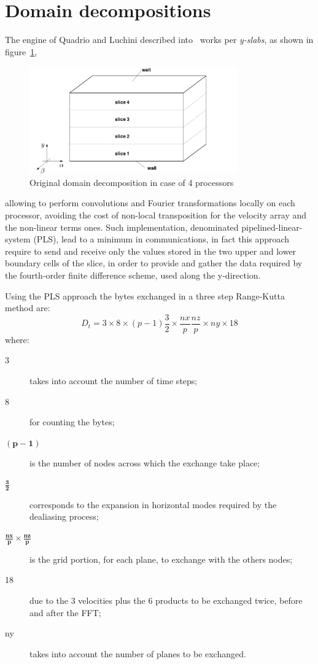 \section{Domain decompositions}
The engine of Quadrio and Luchini described into~\cite{cpl:presentazione} works per \emph{y-slabs}, as shown in figure~\ref{domain_decomp},
\begin{figure}
\centering
\includegraphics[width=0.8\textwidth]{grafici/decomp_dominio_cpl}
\caption{Original domain decomposition in case of 4 processors}
\label{domain_decomp}
\end{figure}
 allowing to perform convolutions and Fourier transformations locally on each processor, avoiding the cost of non-local transposition for the velocity array and the non-linear terms ones. Such implementation, denominated pipelined-linear-system (PLS), lead to a minimum in communications, in fact this approach require to send and receive only the values stored in the two upper and lower boundary cells of the slice, in order to provide and gather the data required by the fourth-order finite difference scheme, used along the y-direction.
 \par
 Using the PLS approach the bytes exchanged in a three step Range-Kutta method are:
 \begin{equation}
 D_{t} = 3 \times 8 \times (p-1) \frac{3}{2} \times \frac{nx}{p} \frac{nz}{p} \times ny \times 18
 \label{exchange:data:cpl}
 \end{equation}
 where:
 \begin{description}
  \item[3] takes into account the number of time steps;
  \item[8] for counting the bytes;
  \item[$\mathbf{(p-1)}$] is the number of nodes across which the exchange take place;
  \item[ $\mathbf{\frac{3}{2}}$ ] corresponds to the expansion in horizontal modes required by the dealiasing process;
  \item[ $\mathbf{\frac{nx}{p} \times \frac{nz}{p}}$] is the grid portion, for each plane, to exchange with the others nodes;
  \item[18] due to the 3 velocities plus the 6 products to be exchanged twice, before and after the FFT;
  \item[ny] takes into account the number of planes to be exchanged.
\end{description}
